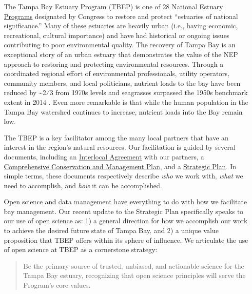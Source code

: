 \documentclass[
]{book}
\begin{document}
The Tampa Bay Estuary Program (\href{https://www.tbep.org}{TBEP}) is one of \href{http://nationalestuaries.org/}{28 National Estuary Programs} designated by Congress to restore and protect ``estuaries of national significance.'' Many of these estuaries are heavily urban (i.e., having economic, recreational, cultural importance) and have had historical or ongoing issues contributing to poor environmental quality. The recovery of Tampa Bay is an exceptional story of an urban estuary that demonstrates the value of the NEP approach to restoring and protecting environmental resources. Through a coordinated regional effort of environmental professionals, utility operators, community members, and local politicians, nutrient loads to the bay have been reduced by \textasciitilde2⁄3 from 1970s levels and seagrasses surpassed the 1950s benchmark extent in 2014 \citep{Greening14, Sherwood17}. Even more remarkable is that while the human population in the Tampa Bay watershed continues to increase, nutrient loads into the Bay remain low.

The TBEP is a key facilitator among the many local partners that have an interest in the region's natural resources. Our facilitation is guided by several documents, including an \href{https://drive.google.com/file/d/1iJcWxmc5SeyDTqiCQ3MLQGWEY_EDGtZT/view?usp=sharing}{Interlocal Agreement} with our partners, a \href{https://indd.adobe.com/view/cf7b3c48-d2b2-4713-921c-c2a0d4466632}{Comprehensive Conservation and Management Plan}, and a \href{https://drive.google.com/file/d/11xohuoaHDxNHRqgXoOHdI37FpWvac_rn/view?usp=sharing}{Strategic Plan}. In simple terms, these documents respectively describe \emph{who} we work with, \emph{what} we need to accomplish, and \emph{how} it can be accomplished.

Open science and data management have everything to do with how we facilitate bay management. Our recent update to the Strategic Plan specifically speaks to our use of open science as: 1) a general direction for how we accomplish our work to achieve the desired future state of Tampa Bay, and 2) a unique value proposition that TBEP offers within its sphere of influence. We articulate the use of open science at TBEP as a cornerstone strategy:

\begin{quote}
Be the primary source of trusted, unbiased, and actionable science for the Tampa Bay estuary, recognizing that open science principles will serve the Program's core values.
\end{quote}
\end{document}
